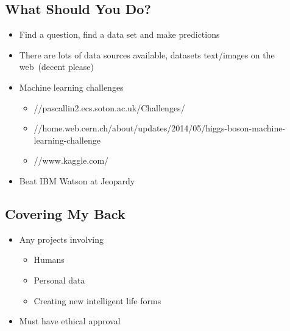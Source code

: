 
\begin{slide}
\section{What Should You Do?}

\begin{PauseHighLight}
  \begin{itemize}
  \item Find a question, find a data set and make predictions\pause
  \item There are lots of data sources available, datasets text/images
    on the web\pause\ (decent please)\pauseb
  \item Machine learning challenges
    \begin{itemize}
    \item //pascallin2.ecs.soton.ac.uk/Challenges/
    \item //home.web.cern.ch/about/updates/2014/05/higgs-boson-machine-learning-challenge
    \item //www.kaggle.com/\pause
    \end{itemize}
  \item Beat IBM Watson at Jeopardy\pause 
  \end{itemize}
\end{PauseHighLight}

\end{slide}


\begin{slide}
\section{Covering My Back}

\begin{PauseHighLight}
  \begin{itemize}
  \item Any projects involving
    \begin{itemize}
    \item Humans\pause
    \item Personal data\pause
    \item Creating new intelligent life forms\pauseb
    \end{itemize}
  \item Must have ethical approval\pause
  \end{itemize}
\end{PauseHighLight}

\end{slide}


